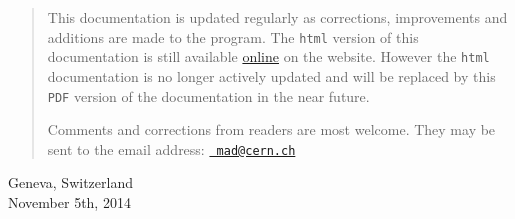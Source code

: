 \begin{titlepage}
\begin{quotation}
This documentation is updated regularly as corrections, improvements
and additions are made to the program. 
The {\tt html} version of this documentation is still
available \href{http://cern.ch/madx/madX/doc/usrguide/uguide.html}{online}
on the \href{http://cern.ch/madx}{\madx} website. However the {\tt html}
documentation is no longer actively updated and  will be replaced
by this {\tt PDF} version of the documentation in the near future. 

Comments and corrections from readers are most welcome. They may be sent to the
email address: \href{mailto:mad@cern.ch?subject=[user's guide]}{\tt 
mad@cern.ch}
\end{quotation}
\vfill

\begin{center}
Geneva, Switzerland \\
November 5th, 2014
\end{center}

\end{titlepage}



